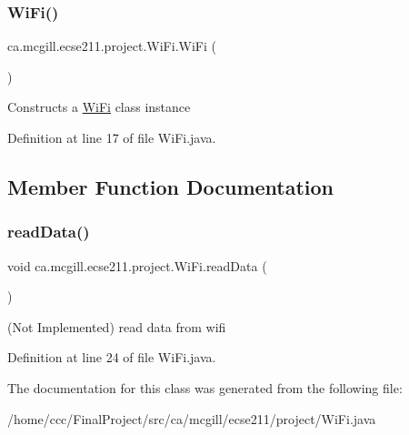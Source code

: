 \subsubsection{\texorpdfstring{Wi\+Fi()}{WiFi()}}
{\footnotesize\ttfamily ca.\+mcgill.\+ecse211.\+project.\+Wi\+Fi.\+Wi\+Fi (\begin{DoxyParamCaption}{ }\end{DoxyParamCaption})}

Constructs a \hyperlink{classca_1_1mcgill_1_1ecse211_1_1project_1_1_wi_fi}{Wi\+Fi} class instance 

Definition at line 17 of file Wi\+Fi.\+java.



\subsection{Member Function Documentation}
\mbox{\label{classca_1_1mcgill_1_1ecse211_1_1project_1_1_wi_fi_aa40dba958b0bb4cc8cb5aeae636e3b08}} 
\subsubsection{\texorpdfstring{read\+Data()}{readData()}}
{\footnotesize\ttfamily void ca.\+mcgill.\+ecse211.\+project.\+Wi\+Fi.\+read\+Data (\begin{DoxyParamCaption}{ }\end{DoxyParamCaption})}

(Not Implemented) read data from wifi 

Definition at line 24 of file Wi\+Fi.\+java.



The documentation for this class was generated from the following file\+:\begin{DoxyCompactItemize}
\item 
/home/ccc/\+Final\+Project/src/ca/mcgill/ecse211/project/Wi\+Fi.\+java\end{DoxyCompactItemize}
